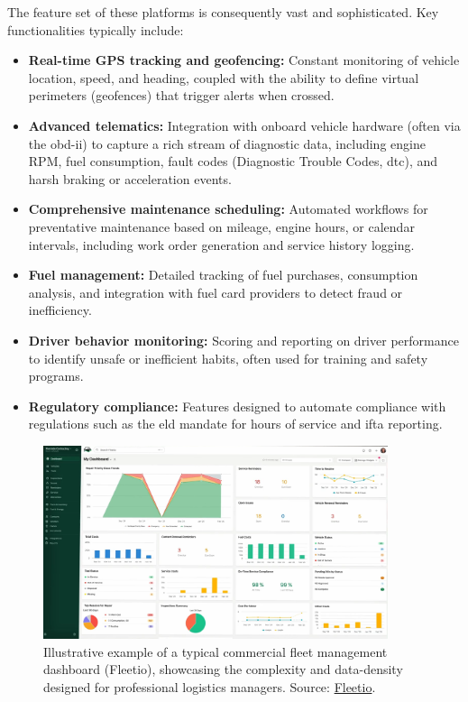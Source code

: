 The feature set of these platforms is consequently vast and sophisticated. Key functionalities typically include:
\begin{itemize}
    \item \textbf{Real-time GPS tracking and geofencing:} Constant monitoring of vehicle location, speed, and heading, coupled with the ability to define virtual perimeters (geofences) that trigger alerts when crossed.
    \item \textbf{Advanced telematics:} Integration with onboard vehicle hardware (often via the \gls{obd-ii}) to capture a rich stream of diagnostic data, including engine RPM, fuel consumption, fault codes (Diagnostic Trouble Codes, \gls{dtc}), and harsh braking or acceleration events.
    \item \textbf{Comprehensive maintenance scheduling:} Automated workflows for preventative maintenance based on mileage, engine hours, or calendar intervals, including work order generation and service history logging.
    \item \textbf{Fuel management:} Detailed tracking of fuel purchases, consumption analysis, and integration with fuel card providers to detect fraud or inefficiency.
    \item \textbf{Driver behavior monitoring:} Scoring and reporting on driver performance to identify unsafe or inefficient habits, often used for training and safety programs.
    \item \textbf{Regulatory compliance:} Features designed to automate compliance with regulations such as the \gls{eld} mandate for hours of service and \gls{ifta} reporting.
\end{itemize}

\begin{figure}[h!]
    \centering
    \includegraphics[width=0.9\textwidth]{images/background/fleetio.png}
    \caption{Illustrative example of a typical commercial fleet management dashboard (Fleetio), showcasing the complexity and data-density designed for professional logistics managers. Source: \href{https://www.fleetio.com/}{Fleetio}.}
\end{figure}

